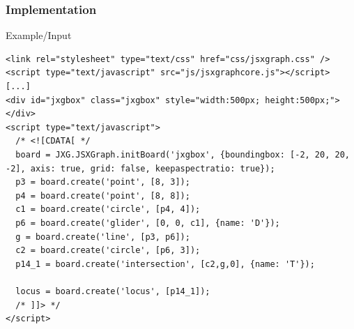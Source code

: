 \documentclass{beamer}
\begin{document}


\begin{frame}[fragile]
  \frametitle{Implementation}

  \begin{block}{Example/Input}
    \begin{lstlisting}
<link rel="stylesheet" type="text/css" href="css/jsxgraph.css" />
<script type="text/javascript" src="js/jsxgraphcore.js"></script>
[...]
<div id="jxgbox" class="jxgbox" style="width:500px; height:500px;"></div>
<script type="text/javascript">
  /* <![CDATA[ */
  board = JXG.JSXGraph.initBoard('jxgbox', {boundingbox: [-2, 20, 20, -2], axis: true, grid: false, keepaspectratio: true});
  p3 = board.create('point', [8, 3]);
  p4 = board.create('point', [8, 8]);
  c1 = board.create('circle', [p4, 4]);
  p6 = board.create('glider', [0, 0, c1], {name: 'D'});
  g = board.create('line', [p3, p6]);
  c2 = board.create('circle', [p6, 3]);
  p14_1 = board.create('intersection', [c2,g,0], {name: 'T'});

  locus = board.create('locus', [p14_1]);
  /* ]]> */
</script>
    \end{lstlisting}
  \end{block}
\end{frame}
\end{document}
